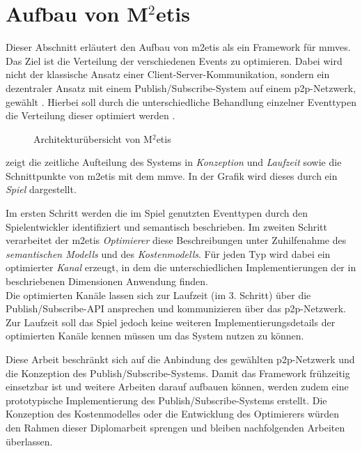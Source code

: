 \section{Aufbau von M$^2$etis}
\label{chap:aufbau_metis}

Dieser Abschnitt erläutert den Aufbau von \ac{m2etis} als ein Framework für \acp{mmve}. Das Ziel ist die Verteilung der verschiedenen Events zu optimieren. Dabei wird nicht der klassische Ansatz einer Client-Server-Kommunikation, sondern ein dezentraler Ansatz mit einem Publish/Subscribe-System auf einem \ac{p2p}-Netzwerk, gewählt \cite{Fischer2010a}. Hierbei soll durch die unterschiedliche Behandlung einzelner Eventtypen die Verteilung dieser optimiert werden \cite{Fischer2010Event}.

\begin{figure}[htbp]
\centering
{}
\caption{Architekturübersicht von M$^2$etis}
\label{fig:metis_aufbau}
\end{figure}

 zeigt die zeitliche Aufteilung des Systems in \emph{Konzeption} und \emph{Laufzeit} sowie die Schnittpunkte von \ac{m2etis} mit dem \ac{mmve}. In der Grafik wird dieses durch ein \emph{Spiel} dargestellt.

Im ersten Schritt werden die im Spiel genutzten Eventtypen durch den Spielentwickler identifiziert und semantisch beschrieben. Im zweiten Schritt verarbeitet der \ac{m2etis} \emph{Optimierer} diese Beschreibungen unter Zuhilfenahme des \emph{semantischen Modells} und des \emph{Kostenmodells}. Für jeden Typ wird dabei ein optimierter \emph{Kanal} erzeugt, in dem die unterschiedlichen Implementierungen der in \cite{Fischer2010a} beschriebenen Dimensionen Anwendung finden.\\
Die optimierten Kanäle lassen sich zur Laufzeit (im 3. Schritt) über die Publish/Subscribe-API ansprechen und kommunizieren über das \ac{p2p}-Netzwerk. Zur Laufzeit soll das Spiel jedoch keine weiteren Implementierungsdetails der optimierten Kanäle kennen müssen um das System nutzen zu können.

Diese Arbeit beschränkt sich auf die Anbindung des gewählten \ac{p2p}-Netzwerk und die Konzeption des Publish/Subscribe-Systems. Damit das Framework frühzeitig einsetzbar ist und weitere Arbeiten darauf aufbauen können, werden zudem eine prototypische Implementierung des Publish/Subscribe-Systems erstellt. Die Konzeption des Kostenmodelles oder die Entwicklung des Optimierers würden den Rahmen dieser Diplomarbeit sprengen und bleiben nachfolgenden Arbeiten überlassen.
